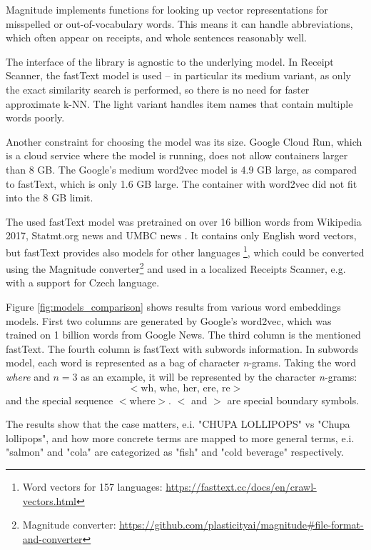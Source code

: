 \documentclass[
  digital, %
  table,   %
  oneside, %
  lof,     %
  lot,     %
]{fithesis3}
\begin{document}
Magnitude implements functions for looking up
vector representations for misspelled or out-of-vocabulary words. This means it can handle abbreviations, which often appear on receipts, and whole sentences reasonably well.

The interface of the library is agnostic to the underlying model.
In Receipt Scanner, the fastText model is used – in particular its medium variant, as only the exact similarity search is performed, so there is no need for faster approximate k-NN. The light variant handles item names that contain multiple words poorly.

Another constraint for choosing the model was its size. Google Cloud Run, which is a cloud service where the model is running, does not allow containers larger than 8 GB. The Google's medium word2vec model is 4.9 GB large, as compared to fastText, which is only 1.6 GB large. The container with word2vec did not fit into the 8 GB limit.

The used fastText model was pretrained on over 16 billion words from Wikipedia 2017, Statmt.org news and UMBC news \cite{mikolov2018advances}. It contains only English word vectors, but fastText provides also models for other languages \footnote{Word vectors for 157 languages: \url{https://fasttext.cc/docs/en/crawl-vectors.html}}, which could be converted using the Magnitude converter\footnote{Magnitude converter: \url{https://github.com/plasticityai/magnitude\#file-format-and-converter}} and used in a localized Receipts Scanner, e.g. with a support for Czech language.

Figure \ref{fig:models_comparison} shows results from various word embeddings models. First two columns are generated by Google's word2vec, which was trained on 1 billion words from Google News. The third column is the mentioned fastText. The fourth column is fastText with subwords information. In subwords model, each word is represented as a bag of character \textit{n}-grams. Taking the
word \textit{where} and $n = 3$ as an example, it will be
represented by the character \textit{n}-grams:
\[
<\text{wh, whe, her, ere, re}>
\]
and the special sequence $<\text{where}>$. $<$ and $>$ are special boundary symbols. \cite{bojanowski-etal-2017-enriching}

The results show that the case matters, e.i. "CHUPA LOLLIPOPS" vs "Chupa lollipops", and how more concrete terms are mapped to more general terms, e.i. "salmon" and "cola" are categorized as "fish" and "cold beverage" respectively.
\end{document}
